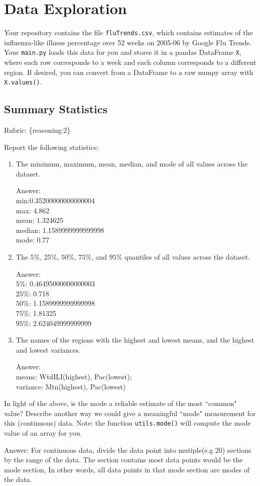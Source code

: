 \documentclass{article}
\def\rubric#1{\gre{Rubric: \{#1\}}}{}
\def\ans#1{\par\gre{Answer: #1}}
\def\blu#1{{\color{blu}#1}}
\def\gre#1{{\color{gre}#1}}
\def\enum#1{\begin{enumerate}#1\end{enumerate}}
\begin{document}
\section{Data Exploration}


Your repository contains the file \texttt{fluTrends.csv}, which contains estimates
of the influenza-like illness percentage over 52 weeks on 2005-06 by Google Flu Trends.
Your \texttt{main.py} loads this data for you and stores it in a pandas DataFrame \texttt{X},
where each row corresponds to a week and each column
corresponds to a different
region. If desired, you can convert from a DataFrame to a raw numpy array with \texttt{X.values()}.

\subsection{Summary Statistics}
\rubric{reasoning:2}

\blu{Report the following statistics}:
\enum{
\item The minimum, maximum, mean, median, and mode of all values across the dataset.
\ans{
	\\min:0.35200000000000004
	\\max: 4.862
\\mean: 1.324625
\\median: 1.1589999999999998
\\mode: 0.77
}
\item The $5\%$, $25\%$, $50\%$, $75\%$, and $95\%$ quantiles of all values across the dataset.
\ans{
\\$5\%$: 0.46495000000000003
\\$25\%$: 0.718
\\$50\%$: 1.1589999999999998
\\$75\%$: 1.81325
\\$95\%$: 2.624049999999999
}
\item The names of the regions with the highest and lowest means, and the highest and lowest variances.
\ans{
	\\means: WtdILI(highest), Pac(lowest); 
	\\variance: Mtn(highest), Pac(lowest)}
}
In light of the above, \blu{is the mode a reliable estimate of the most ``common" value? Describe another way we could give a meaningful ``mode" measurement for this (continuous) data.} Note: the function \texttt{utils.mode()} will compute the mode value of an array for you.
\ans{For continuous data, divide the data point into mutiple(e.g 20) sections by the range of the data. The section contains most data points would be the mode section, In other words, all data points  in that mode section are modes of the data.}
\end{document}
